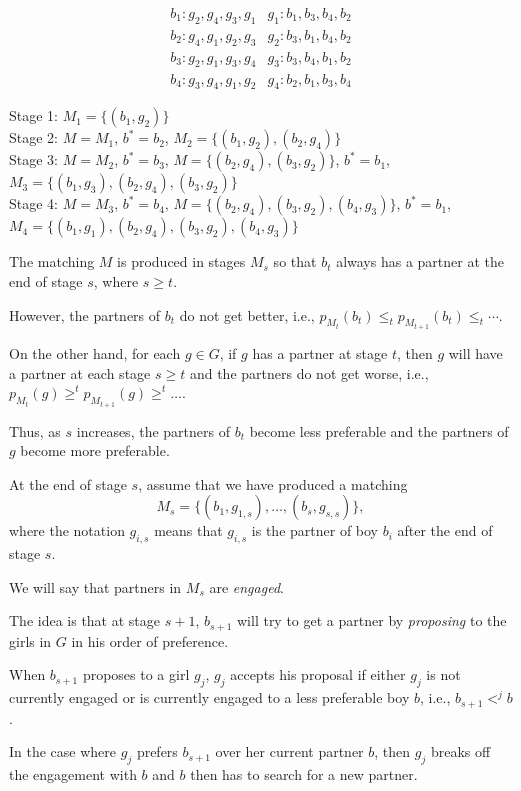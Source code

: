 \begin{frame}
$$
\begin{array}{c|c}
b_1: g_2,g_4,g_3,g_1 & g_1: b_1,b_3,b_4,b_2 \\
b_2: g_4,g_1,g_2,g_3 & g_2: b_3,b_1,b_4,b_2 \\
b_3: g_2,g_1,g_3,g_4 & g_3: b_3,b_4,b_1,b_2 \\
b_4: g_3,g_4,g_1,g_2 & g_4: b_2,b_1,b_3,b_4
\end{array}
$$

Stage 1: $M_1=\{(b_1,g_2)\}$ \\
\pause
Stage 2: $M=M_1$, $b^*=b_2$, $M_2=\{(b_1,g_2),(b_2,g_4)\}$ \\
\pause
Stage 3: $M=M_2$, $b^*=b_3$, $M=\{(b_2,g_4),(b_3,g_2)\}$, $b^*=b_1$,
$M_3=\{(b_1,g_3),(b_2,g_4),(b_3,g_2)\}$ \\
\pause
Stage 4: $M=M_3$, $b^*=b_4$, $M=\{(b_2,g_4),(b_3,g_2),(b_4,g_3)\}$,
$b^*=b_1$, $M_4=\{(b_1,g_1),(b_2,g_4),(b_3,g_2),(b_4,g_3)\}$
\end{frame}

\begin{frame}
The matching $M$ is produced in stages $M_s$ so that $b_t$ always has
a partner at the end of stage $s$, where $s\ge t$.  

However, the
partners of $b_t$ do not get better, i.e., $p_{M_t}(b_t)\le_t
p_{M_{t+1}}(b_t)\le_t\cdots$.  

On the other hand, for each $g\in G$,
if $g$ has a partner at stage $t$, then $g$ will have a partner at
each stage $s\ge t$ and the partners do not get worse, i.e.,
$p_{M_t}(g)\ge^t p_{M_{t+1}}(g)\ge^t\ldots$.  
\end{frame}

\begin{frame}
Thus, as $s$ increases,
the partners of $b_t$ become less preferable and the partners of $g$
become more preferable.

At the end of stage $s$, assume that we have
produced a matching
$$
M_s=\{(b_1,g_{1,s}),\ldots,(b_s,g_{s,s})\},
$$
where the notation $g_{i,s}$ means that $g_{i,s}$ is the partner of
boy $b_i$ after the end of stage $s$.
\end{frame}

\begin{frame}
We will say that partners in $M_s$ are {\em engaged}.  

The idea is
that at stage $s+1$, $b_{s+1}$ will try to get a partner by {\em
proposing} to the girls in $G$ in his order of preference.   

When
$b_{s+1}$ proposes to a girl $g_j$, $g_j$ accepts his proposal if
either $g_j$ is not currently engaged or is currently engaged to a
less preferable boy $b$, i.e., $b_{s+1}<^jb$.  

In the case where $g_j$
prefers $b_{s+1}$ over her current partner $b$, then $g_j$ breaks off
the engagement with $b$ and $b$ then has to search for a new partner. 
\end{frame}


